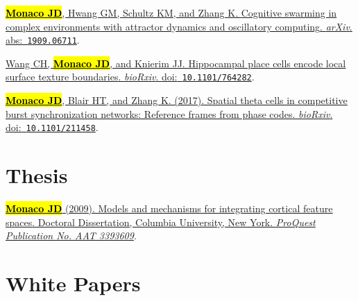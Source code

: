 \documentclass[10pt]{article}
\newcommand{\itemtitle}[1]{{\color{hopkinsblue}\ul{#1}}}
\newcommand{\joehl}[1]{\hl{\textbf{#1}}}
\newcommand{\doi}[1]{{\color{darkgray}doi:}~{\color{dimgray}\texttt{#1}}}
\newcommand{\abs}[1]{{\color{darkgray}abs:}~{\color{dimgray}\texttt{#1}}}
\begin{document}
\begin{description}
  \item \href{https://arxiv.org/abs/1909.06711}
    {\joehl{Monaco JD}, Hwang GM, Schultz KM, and Zhang K. \itemtitle{Cognitive
        swarming in complex environments with attractor dynamics and oscillatory
    computing}. \emph{arXiv}. \abs{1909.06711}}.
  \item \href{http://doi.org/10.1101/764282}
    {Wang CH, \joehl{Monaco JD}, and Knierim JJ. \itemtitle{Hippocampal
      place cells encode local surface texture boundaries}. \emph{bioRxiv}.
    \doi{10.1101/764282}}.
  \item \href{http://dx.doi.org/10.1101/211458}
    {\joehl{Monaco JD}, Blair HT, and Zhang K. (2017). \itemtitle{Spatial theta
        cells in competitive burst synchronization networks: Reference frames from
    phase codes}. \emph{bioRxiv}. \doi{10.1101/211458}}.
\end{description}

\section*{Thesis}

\begin{description}
  \item \href{http://search.proquest.com/docview/304862872/abstract}
    {\joehl{Monaco JD} (2009). \itemtitle{Models and mechanisms for integrating
      cortical feature spaces}. Doctoral Dissertation, Columbia University, New
    York. \emph{ProQuest Publication No. AAT 3393609}}.
\end{description}

\section*{White Papers} \label{sec:whitepapers}
\end{document}

